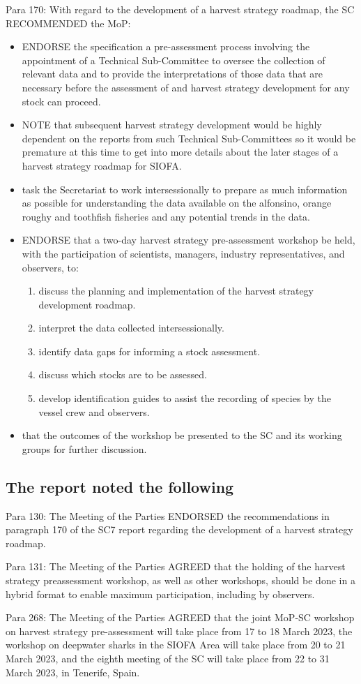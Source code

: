 Para 170: With regard to the development of a harvest strategy roadmap, the SC RECOMMENDED the MoP:
\begin{itemize}
	\item ENDORSE the specification a pre-assessment process involving the appointment of a Technical Sub-Committee to oversee the collection of relevant data and to provide the interpretations of those data that are necessary before the assessment of and harvest strategy development for any stock can proceed.
	\item NOTE that subsequent harvest strategy development would be highly dependent on the reports from such Technical Sub-Committees so it would be premature at this time to get into more details about the later stages of a harvest strategy roadmap for SIOFA.
	\item task the Secretariat to work intersessionally to prepare as much information as possible for understanding the data available on the alfonsino, orange roughy and toothfish fisheries and any potential trends in the data.
	\item ENDORSE that a two-day harvest strategy pre-assessment workshop be held, with the participation of scientists, managers, industry representatives, and observers, to:
	\begin{enumerate}
		\item discuss the planning and implementation of the harvest strategy development roadmap.
		\item interpret the data collected intersessionally.
		\item identify data gaps for informing a stock assessment.
		\item discuss which stocks are to be assessed.
		\item develop identification guides to assist the recording of species by the vessel crew and observers.
	\end{enumerate}
	\item that the outcomes of the workshop be presented to the SC and its working groups for further discussion.
\end{itemize}

\subsection{The \cite{MoP9} report noted the following}

Para 130: The Meeting of the Parties ENDORSED the recommendations in paragraph 170 of the SC7 report regarding the development of a harvest strategy roadmap.

Para 131: The Meeting of the Parties AGREED that the holding of the harvest strategy preassessment workshop, as well as other workshops, should be done in a hybrid format to enable maximum participation, including by observers.

Para 268: The Meeting of the Parties AGREED that the joint MoP-SC workshop on harvest strategy pre-assessment will take place from 17 to 18 March 2023, the workshop on deepwater sharks in the SIOFA Area will take place from 20 to 21 March 2023, and the eighth meeting of the SC will take place from 22 to 31 March 2023, in Tenerife, Spain.
